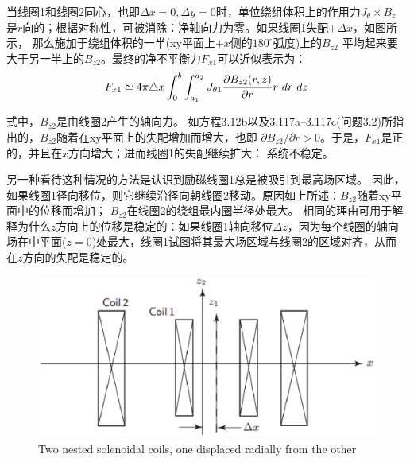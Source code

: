 当线圈1和线圈2同心，也即$\Delta x=0,\Delta y=0$时，单位绕组体积上的作用力$J_\theta \times B_z$
是$r$向的；根据对称性，可被消除：净轴向力为零。如果线圈1失配$+\Delta x$，如图所示，
那么施加于绕组体积的一半(xy平面上$+x$侧的$180^\circ$弧度)上的$B_{z2}$
平均起来要大于另一半上的$B_{z2}$。最终的净不平衡力$F_{x1}$可以近似表示为：
\begin{equation}%
F_{x1}\simeq4\pi\triangle x\int_{0}^{b}\int_{a_{1}}^{a_{2}}J_{\theta1}\frac{\partial B_{z2}(r,z)}{\partial r}r\ dr\ dz\\
\end{equation}

式中，$B_{z2}$是由线圈2产生的轴向力。
如方程3.12b以及3.117a–3.117c(问题3.2)所指出的，$B_{z2}$随着在xy平面上的失配增加而增大，也即
$\partial B_{z2}/\partial r>0$。于是，$F_{x1}$是正的，并且在$x$方向增大；进而线圈1的失配继续扩大：
系统不稳定。

另一种看待这种情况的方法是认识到励磁线圈1总是被吸引到最高场区域。
因此，如果线圈1径向移位，则它继续沿径向朝线圈2移动。原因如上所述：$B_{z2}$随着xy平面中的位移而增加； $B_{z2}$在线圈2的绕组最内圈半径处最大。
相同的理由可用于解释为什么$z$方向上的位移是稳定的：如果线圈1轴向移位$\Delta z$，因为每个线圈的轴向场在中平面($z = 0$)处最大，线圈1试图将其最大场区域与线圈2的区域对齐，从而在$z$方向的失配是稳定的。
\begin{figure}[htbp]
	\centering
	\includegraphics[scale=0.5]{chpt3/figs/fig3.47.eps}
	\caption{Two nested solenoidal coils, one displaced radially from the other}
\end{figure}
\newpage



